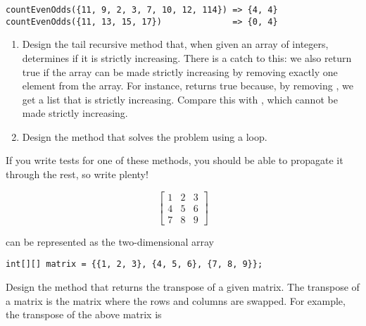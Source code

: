 \par{
\begin{verbatim}
countEvenOdds({11, 9, 2, 3, 7, 10, 12, 114}) => {4, 4}
countEvenOdds({11, 13, 15, 17})              => {0, 4}
\end{verbatim}
}

\begin{enumerate}[label=(\alph*)]
    \item Design the  tail recursive method that, when given an array of integers, determines if it is strictly increasing. There is a catch to this: we also return true if the array can be made strictly increasing by removing exactly one element from the array. For instance,  returns true because, by removing , we get a list that is strictly increasing. Compare this with , which cannot be made strictly increasing.
    \item Design the  method that solves the problem using a loop.
\end{enumerate}
If you write tests for one of these methods, you should be able to propagate it through the rest, so write plenty!


\[
\begin{bmatrix}
    1 & 2 & 3\\
    4 & 5 & 6\\
    7 & 8 & 9
\end{bmatrix}
\]

\noindent can be represented as the two-dimensional array

\par{
\begin{verbatim}
int[][] matrix = {{1, 2, 3}, {4, 5, 6}, {7, 8, 9}};
\end{verbatim}
}

\noindent Design the  method that returns the transpose of a given matrix. The transpose of a matrix is the matrix where the rows and columns are swapped. For example, the transpose of the above matrix is

